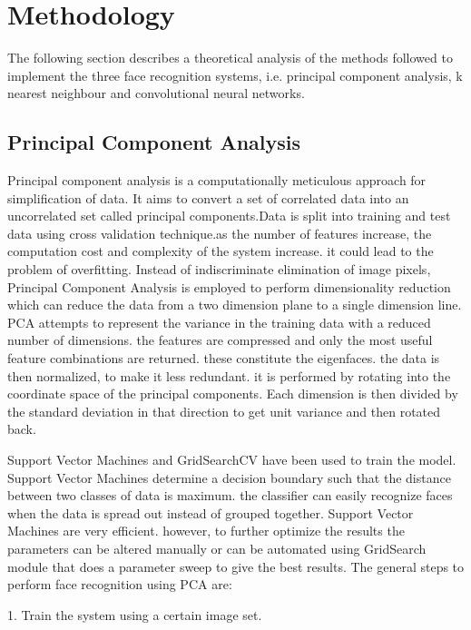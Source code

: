 \documentclass[conference]{IEEEtran}
\begin{document}
\section{Methodology}
\label{sec:3 Methodology} 
The following section describes a theoretical analysis of the methods followed to implement the three face recognition systems, i.e. principal component analysis, k nearest neighbour and convolutional neural networks.



 

\subsection{Principal Component Analysis}
\label{subsec:3.1 Principal Component Analysis}
Principal component analysis is a computationally meticulous approach for simplification of data. It aims to convert a set of correlated data into an uncorrelated set called principal components\cite{turk1991face}.Data is split into training and test data using cross validation technique.as the number of features increase, the computation cost and complexity of the system increase. it could lead to the problem of overfitting. Instead of indiscriminate elimination of image pixels,  Principal Component Analysis is employed to perform dimensionality reduction which can reduce the data from a two dimension plane to a single dimension line. PCA attempts to represent the variance in the training data with a reduced number of dimensions.  the features are compressed and only the most useful feature combinations are returned. these constitute the eigenfaces. the data is then normalized, to make it less redundant. it is performed by rotating into the coordinate space of the principal components. Each dimension is then divided by the standard deviation in that direction to get unit variance and then rotated back. 

Support Vector Machines and GridSearchCV have been used to train the model. Support Vector Machines determine a decision boundary such that the distance between two classes of data is maximum. the classifier can easily recognize faces when the data is spread out instead of grouped together. Support Vector Machines are very efficient. however, to further optimize the results the parameters can be altered manually or can be automated using GridSearch module that does a parameter sweep to give the best results.
The general steps to perform face recognition using PCA are:

	1. Train the system using a certain image set.
    
\end{document}
